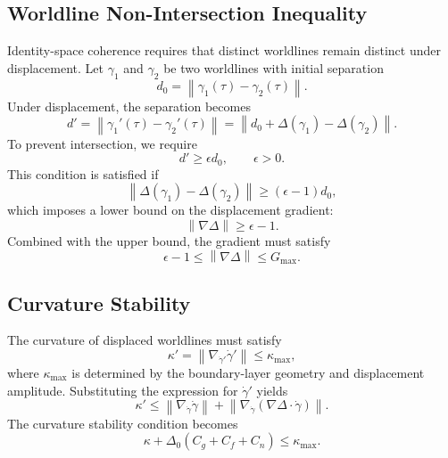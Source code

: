\documentclass[aip,adv,reprint,floatfix]{revtex4-2}
\begin{document}
\subsection{Worldline Non-Intersection Inequality}

Identity-space coherence requires that distinct worldlines remain distinct under displacement. Let $\gamma_1$ and $\gamma_2$ be two worldlines with initial separation
\begin{equation}
d_0 = \left\| \gamma_1(\tau) - \gamma_2(\tau) \right\|.
\end{equation}
Under displacement, the separation becomes
\begin{equation}
d' = \left\| \gamma_1'(\tau) - \gamma_2'(\tau) \right\|
= \left\| d_0 + \Delta(\gamma_1) - \Delta(\gamma_2) \right\|.
\end{equation}
To prevent intersection, we require
\begin{equation}
d' \geq \epsilon d_0,
\qquad
\epsilon > 0.
\end{equation}
This condition is satisfied if
\begin{equation}
\left\| \Delta(\gamma_1) - \Delta(\gamma_2) \right\|
\geq
(\epsilon - 1) d_0,
\end{equation}
which imposes a lower bound on the displacement gradient:
\begin{equation}
\left\| \nabla \Delta \right\| \geq \epsilon - 1.
\end{equation}
Combined with the upper bound, the gradient must satisfy
\begin{equation}
\epsilon - 1 \leq \left\| \nabla \Delta \right\| \leq G_{\max}.
\end{equation}

\subsection{Curvature Stability}

The curvature of displaced worldlines must satisfy
\begin{equation}
\kappa' = 
\left\|
\nabla_{\dot{\gamma}'} \dot{\gamma}'
\right\|
\leq \kappa_{\max},
\end{equation}
where $\kappa_{\max}$ is determined by the boundary-layer geometry and displacement amplitude. Substituting the expression for $\dot{\gamma}'$ yields
\begin{equation}
\kappa' \leq 
\left\|
\nabla_{\dot{\gamma}} \dot{\gamma}
\right\|
+
\left\|
\nabla_{\dot{\gamma}} \left( \nabla \Delta \cdot \dot{\gamma} \right)
\right\|.
\end{equation}
The curvature stability condition becomes
\begin{equation}
\kappa + \Delta_0 (C_g + C_f + C_n) \leq \kappa_{\max}.
\end{equation}
\end{document}
